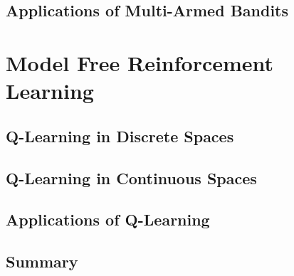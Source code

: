 \documentclass[11pt]{article}
\theoremstyle{definition}
\begin{document}
\subsection{Applications of Multi-Armed Bandits}\label{sec:applications-of-multi-armed-bandits}

\section{Model Free Reinforcement Learning}\label{sec:reinforcement-learning}
\subsection{Q-Learning in Discrete Spaces}\label{sec:q-learning}
\subsection{Q-Learning in Continuous Spaces}\label{sec:q-learning-continuous}
\subsection{Applications of Q-Learning}\label{sec:applications-of-q-learning}
\subsection{Summary}

\clearpage

\end{document}
